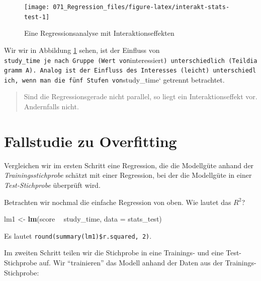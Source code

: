 \documentclass[12pt,ngerman,]{book}
\makeatletter
\newenvironment{Shaded}{\begin{snugshade}}{\end{snugshade}}
\newcommand{\KeywordTok}[1]{\textcolor[rgb]{0.13,0.29,0.53}{\textbf{#1}}}
\newcommand{\DataTypeTok}[1]{\textcolor[rgb]{0.13,0.29,0.53}{#1}}
\newcommand{\StringTok}[1]{\textcolor[rgb]{0.31,0.60,0.02}{#1}}
\newcommand{\OperatorTok}[1]{\textcolor[rgb]{0.81,0.36,0.00}{\textbf{#1}}}
\newcommand{\NormalTok}[1]{#1}
\newenvironment{kframe}{%
\medskip{}
\setlength{\fboxsep}{.8em}
 \def\at@end@of@kframe{}%
 \ifinner\ifhmode%
  \def\at@end@of@kframe{\end{minipage}}%
  \begin{minipage}{\columnwidth}%
 \fi\fi%
 \def\FrameCommand##1{\hskip\@totalleftmargin \hskip-\fboxsep
 \colorbox{shadecolor}{##1}\hskip-\fboxsep
     \hskip-\linewidth \hskip-\@totalleftmargin \hskip\columnwidth}%
 \MakeFramed {\advance\hsize-\width
   \@totalleftmargin\z@ \linewidth\hsize
   \@setminipage}}%
 {\par\unskip\endMakeFramed%
 \at@end@of@kframe}
\renewenvironment{Shaded}{\begin{kframe}}{\end{kframe}}
\theoremstyle{definition}
\theoremstyle{definition}
\theoremstyle{remark}
\makeatother
\begin{document}
\begin{figure}

{\centering \texttt{[image: 071\_Regression\_files/figure-latex/interakt-stats-test-1]} 

}

\caption{Eine Regressionsanalyse mit Interaktionseffekten}\label{fig:interakt-stats-test}
\end{figure}

Wir wir in Abbildung \ref{fig:interakt-stats-test} sehen, ist der
Einfluss von
\texttt{study\_time\textquotesingle{}\ je\ nach\ Gruppe\ (Wert\ von}interessiert\texttt{)\ unterschiedlich\ (Teildiagramm\ A).\ Analog\ ist\ der\ Einfluss\ des\ Interesses\ (leicht)\ unterschiedlich,\ wenn\ man\ die\ fünf\ Stufen\ von}study\_time`
getrennt betrachtet.

\begin{quote}
Sind die Regressionsgerade nicht parallel, so liegt ein
Interaktionseffekt vor. Andernfalls nicht.
\end{quote}

\section{Fallstudie zu Overfitting}\label{overfitting-casestudy}

Vergleichen wir im ersten Schritt eine Regression, die die Modellgüte
anhand der \emph{Trainingsstichprobe} schätzt mit einer Regression, bei
der die Modellgüte in einer \emph{Test-Stichprobe} überprüft wird.

Betrachten wir nochmal die einfache Regression von oben. Wie lautet das
\(R^2\)?

\begin{Shaded}
\begin{Highlighting}[]

\NormalTok{lm1 <-}\StringTok{ }\KeywordTok{lm}\NormalTok{(score }\OperatorTok{~}\StringTok{ }\NormalTok{study_time, }\DataTypeTok{data =}\NormalTok{ stats_test)}
\end{Highlighting}
\end{Shaded}

Es lautet \texttt{round(summary(lm1)\$r.squared,\ 2)}.

Im zweiten Schritt teilen wir die Stichprobe in eine Trainings- und eine
Test-Stichprobe auf. Wir ``trainieren'' das Modell anhand der Daten aus
der Trainings-Stichprobe:
\end{document}
